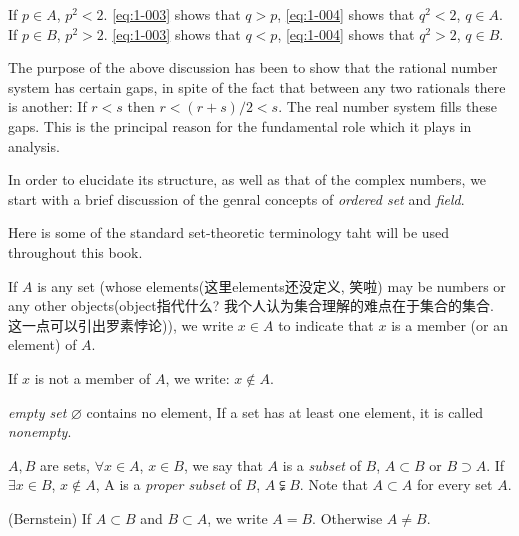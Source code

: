 If $p\in A$, $p^2<2$. \ref{eq:1-003} shows that $q>p$, \ref{eq:1-004} shows that $q^2<2$, $q\in A$.
If $p\in B$, $p^2>2$. \ref{eq:1-003} shows that $q<p$, \ref{eq:1-004} shows that $q^2>2$, $q\in B$.


\begin{Remark}
The purpose of the above discussion has been to show that the rational number system has certain gaps, 
in spite of the fact that between any two rationals there is another: If $r<s$ then $r<(r+s)/2<s$.
The real number system fills these gaps.
This is the principal reason for the fundamental role which it plays in analysis.
\end{Remark}


In order to elucidate its structure, as well as that of the complex numbers, 
we start with a brief discussion of the genral concepts of \emph{ordered set} and \emph{field}.


Here is some of the standard set-theoretic terminology taht will be used throughout this book.


\begin{Definition}
If $A$ is any set (whose elements(这里elements还没定义, 笑啦) may be numbers or any other objects(object指代什么? 我个人认为集合理解的难点在于集合的集合. 这一点可以引出罗素悖论)), we write $x\in A$ to indicate that $x$ is a member (or an element) of $A$.

If $x$ is not a member of $A$, we write: $x\notin A$.

\emph{empty set} $\varnothing$ contains no element, If a set has at least one element, it is called \emph{nonempty}.

$A,B$ are sets, $\forall x\in A$, $x\in B$, we say that $A$ is a \emph{subset} of $B$, $A\subset B$ or $B\supset A$. If $\exists x\in B$, $x\notin A$, A is a \emph{proper subset} of $B$, $A \subsetneqq B$.
Note that $A\subset A$ for every set $A$.

(Bernstein) If $A\subset B$ and $B\subset A$, we write $A = B$. Otherwise $A\neq B$.
\end{Definition}

